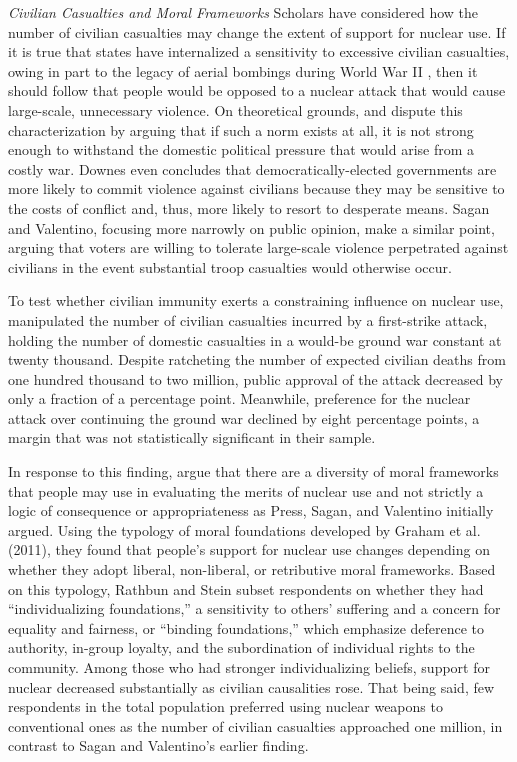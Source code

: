 \documentclass[12pt]{article}
\begin{document}
\textit{Civilian Casualties and Moral Frameworks}
\noindent
Scholars have considered how the number of civilian casualties may change the extent of support for nuclear use. If it is true that states have internalized a sensitivity to excessive civilian casualties, owing in part to the legacy of aerial bombings during World War II \citep{pinker_better_2011, thomas_ethics_2014}, then it should follow that people would be opposed to a nuclear attack that would cause large-scale, unnecessary violence. On theoretical grounds, \citet{downes_desperate_2006} and \citet{sagan_revisiting_2017} dispute this characterization by arguing that if such a norm exists at all, it is not strong enough to withstand the domestic political pressure that would arise from a costly war. Downes even concludes that democratically-elected governments are more likely to commit violence against civilians because they may be sensitive to the costs of conflict and, thus, more likely to resort to desperate means. Sagan and Valentino, focusing more narrowly on public opinion, make a similar point, arguing that voters are willing to tolerate large-scale violence perpetrated against civilians in the event substantial troop casualties would otherwise occur.

To test whether civilian immunity exerts a constraining influence on nuclear use, \citet{sagan_revisiting_2017} manipulated the number of civilian casualties incurred by a first-strike attack, holding the number of domestic casualties in a would-be ground war constant at twenty thousand. Despite ratcheting the number of expected civilian deaths from one hundred thousand to two million, public approval of the attack decreased by only a fraction of a percentage point. Meanwhile, preference for the nuclear attack over continuing the ground war declined by eight percentage points, a margin that was not statistically significant in their sample.

In response to this finding, \citet{rathbun_greater_2019} argue that there are a diversity of moral frameworks that people may use in evaluating the merits of nuclear use and not strictly a logic of consequence or appropriateness as Press, Sagan, and Valentino initially argued. Using the typology of moral foundations developed by Graham et al. (2011), they found that people's support for nuclear use changes depending on whether they adopt liberal, non-liberal, or retributive moral frameworks. Based on this typology, Rathbun and Stein subset  respondents on whether they had “individualizing foundations,” a sensitivity to others' suffering and a concern for equality and fairness, or “binding foundations,” which emphasize deference to authority, in-group loyalty, and the subordination of individual rights to the community. Among those who had stronger individualizing beliefs, support for nuclear decreased substantially as civilian causalities rose. That being said, few respondents in the total population preferred using nuclear weapons to conventional ones as the number of civilian casualties approached one million, in contrast to Sagan and Valentino's earlier finding.
\end{document}
